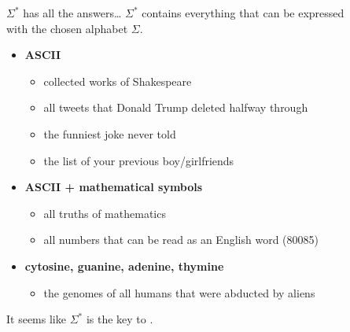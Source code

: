 \documentclass[professionalfonts, xcolor={usenames,svgnames,x11names,table}]{beamer}
\begin{document}
\begin{frame}{$\Sigma^*$ has all the answers\ldots}
    $\Sigma^*$ contains everything that can be expressed\\
    with the chosen alphabet $\Sigma$.
    \begin{itemize}
        \item \textbf{ASCII}
            \begin{itemize}
                \item collected works of Shakespeare
                \item all tweets that Donald Trump deleted halfway through
                \item the funniest joke never told
                \item the list of your previous boy/girlfriends
            \end{itemize}
        \item \textbf{ASCII + mathematical symbols}
            \begin{itemize}
                \item all truths of mathematics
                \item all numbers that can be read as an English word (80085)
            \end{itemize}
        \item \textbf{cytosine, guanine, adenine, thymine}
            \begin{itemize}
                \item the genomes of all humans that were abducted by aliens
            \end{itemize}
    \end{itemize}
    It seems like $\Sigma^*$ is the key to .
\end{frame}
\end{document}
